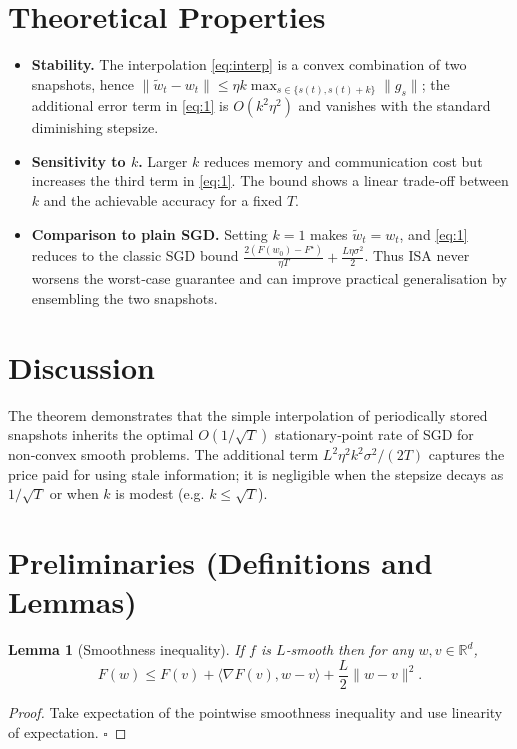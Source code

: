 \documentclass{article}
\newtheorem{lemma}{Lemma}
\newcommand{\RR}{\mathbb{R}}
\begin{document}
\section*{Theoretical Properties}
\begin{itemize}[noitemsep]
\item \textbf{Stability.} The interpolation \eqref{eq:interp} is a convex combination of two
snapshots, hence $\|\widetilde w_t-w_t\|\le \eta k\max_{s\in\{s(t),s(t)+k\}}\|g_s\|$;
the additional error term in \eqref{eq:1} is $O(k^{2}\eta^{2})$ and vanishes with the
standard diminishing stepsize.
\item \textbf{Sensitivity to $k$.} Larger $k$ reduces memory and communication cost
but increases the third term in \eqref{eq:1}.  The bound shows a linear trade‑off
between $k$ and the achievable accuracy for a fixed $T$.
\item \textbf{Comparison to plain SGD.} Setting $k=1$ makes $\widetilde w_t=w_t$,
and \eqref{eq:1} reduces to the classic SGD bound
$ \frac{2(F(w_0)-F^{\star})}{\eta T}+ \frac{L\eta\sigma^{2}}{2}$.
Thus ISA never worsens the worst‑case guarantee and can improve practical
generalisation by ensembling the two snapshots.
\end{itemize}

\section*{Discussion}
The theorem demonstrates that the simple interpolation of periodically stored
snapshots inherits the optimal $O(1/\sqrt{T})$ stationary‑point rate of SGD for
non‑convex smooth problems.  The additional term $L^{2}\eta^{2}k^{2}\sigma^{2}/(2T)$
captures the price paid for using stale information; it is negligible when the
stepsize decays as $1/\sqrt{T}$ or when $k$ is modest (e.g. $k\le\sqrt{T}$).

\section*{Preliminaries (Definitions and Lemmas)}
\begin{lemma}[Smoothness inequality]
\label{lem:smooth}
If $f$ is $L$‑smooth then for any $w,v\in\RR^{d}$,
\[
F(w)\le F(v)+\langle\nabla F(v),w-v\rangle+\frac{L}{2}\|w-v\|^{2}.
\]
\end{lemma}
\begin{proof}
Take expectation of the pointwise smoothness inequality and use linearity of
expectation. $\square$
\end{proof}
\end{document}
